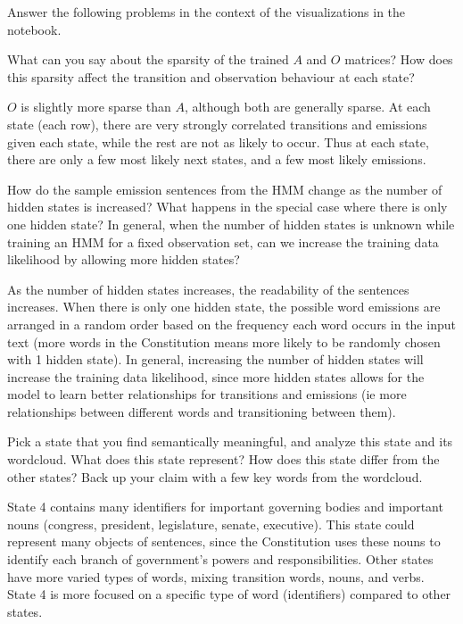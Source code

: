 Answer the following problems in the context of the visualizations in the notebook.

\problem[3] %
What can you say about the sparsity of the trained $A$ and $O$ matrices? How does this sparsity affect the transition and observation behaviour at each state?
\begin{solution}
$O$ is slightly more sparse than $A$, although both are generally sparse. At each state (each row), there are very strongly correlated transitions and emissions given each state, while the rest are not as likely to occur. Thus at each state, there are only a few most likely next states, and a few most likely emissions.
\end{solution}

\problem[5] %
How do the sample emission sentences from the HMM change as the number of hidden states is increased? What happens in the special case where there is only one hidden state? In general, when the number of hidden states is unknown while training an HMM for a fixed observation set, can we increase the training data likelihood by allowing more hidden states?

\begin{solution}
As the number of hidden states increases, the readability of the sentences increases. When there is only one hidden state, the possible word emissions are arranged in a random order based on the frequency each word occurs in the input text (more words in the Constitution means more likely to be randomly chosen with 1 hidden state). In general, increasing the number of hidden states will increase the training data likelihood, since more hidden states allows for the model to learn better relationships for transitions and emissions (ie more relationships between different words and transitioning between them).
\end{solution}


\problem[5] %
Pick a state that you find semantically meaningful, and analyze this state and its wordcloud. What does this state represent? How does this state differ from the other states? Back up your claim with a few key words from the wordcloud.
\begin{solution}
State 4 contains many identifiers for important governing bodies and important nouns (congress, president, legislature, senate, executive). This state could represent many objects of sentences, since the Constitution uses these nouns to identify each branch of government's powers and responsibilities. Other states have more varied types of words, mixing transition words, nouns, and verbs. State 4 is more focused on a specific type of word (identifiers) compared to other states.
\end{solution}


